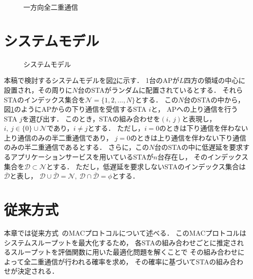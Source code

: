 \documentclass[technicalreport]{ieicej}
\newcommand{\sij}{(i,\ j)}
\newcommand{\mN}{{\mathcal N}}
\begin{document}
	\begin{figure}[t]
		\centering
		\caption{一方向全二重通信}
		\label{fig:topology}
	\end{figure}

\section{システムモデル}
	\begin{figure}[t]
		\centering
		\caption{システムモデル}
		\label{fig:model}
	\end{figure}

	本稿で検討するシステムモデルを図\ref{fig:model}に示す．
	1台のAPが$L$四方の領域の中心に設置され，その周りに$N$台のSTAがランダムに配置されているとする．
	それらSTAのインデックス集合を$\mN=\{1,2,...,N\}$とする．
	この$N$台のSTAの中から，図\ref{fig:topology}のようにAPからの下り通信を受信するSTA $i$と，
	APへの上り通信を行うSTA $j$を選び出す．
	このとき，STAの組み合わせを$\sij$と表現し，$i,\ j \in \{0\}\cup \mN$であり，$i\neq j$とする．
	ただし，$i=0$のときは下り通信を伴わない上り通信のみの半二重通信であり，
	$j=0$のときは上り通信を伴わない下り通信のみの半二重通信であるとする．
	さらに，この$N$台のSTAの中に低遅延を要求するアプリケーションサービスを用いているSTAが$n$台存在し，
	そのインデックス集合を${\mathcal D}\subset\mN$とする．
	ただし，低遅延を要求しないSTAのインデックス集合は${\overline {\mathcal D}}$と表し，
	${\mathcal D} \cup {\overline {\mathcal D}}=\mN,\ {\mathcal D} \cap {\overline {\mathcal D}}=\phi$とする．

\section{従来方式}
	本章では従来方式~\cite{promac}のMACプロトコルについて述べる．
	このMACプロトコルはシステムスループットを最大化するため，
	各STAの組み合わせごとに推定されるスループットを評価関数に用いた最適化問題を解くことで
	その組み合わせによって全二重通信が行われる確率を求め，
	その確率に基づいてSTAの組み合わせが決定される．
\end{document}
